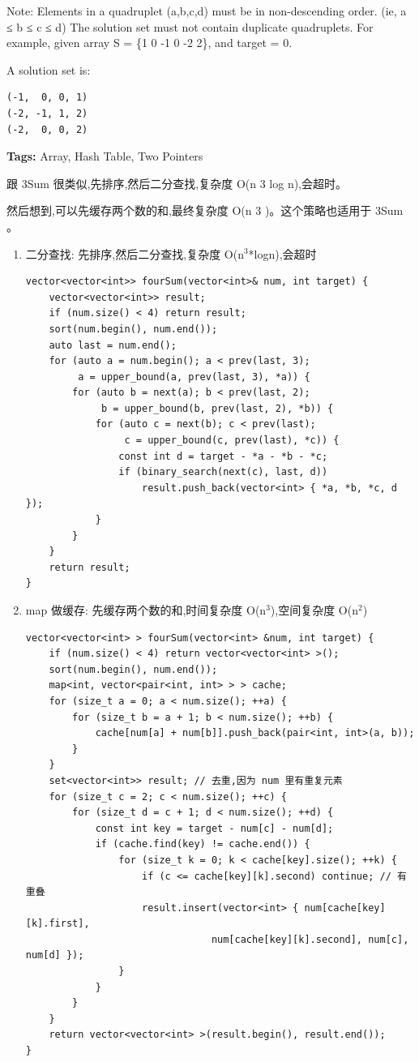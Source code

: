 \documentclass[12pt]{book}
\begin{document}
Note:
Elements in a quadruplet (a,b,c,d) must be in non-descending order. (ie, a ≤ b ≤ c ≤ d)
The solution set must not contain duplicate quadruplets.
    For example, given array S = \{1 0 -1 0 -2 2\}, and target = 0.

A solution set is:
\lstset{language=java,label= ,caption= ,numbers=none}
\begin{lstlisting}
(-1,  0, 0, 1)
(-2, -1, 1, 2)
(-2,  0, 0, 2)
\end{lstlisting}

\textbf{Tags:} Array, Hash Table, Two Pointers

跟 3Sum 很类似,先排序,然后二分查找,复杂度 O(n 3 log n),会超时。

然后想到,可以先缓存两个数的和,最终复杂度 O(n 3 )。这个策略也适用于 3Sum 。

\begin{enumerate}
\item 二分查找: 先排序,然后二分查找,复杂度 O(n$^{\text{3}}$*logn),会超时
\label{sec-15-2-3-1}
\lstset{language=java,label= ,caption= ,numbers=none}
\begin{lstlisting}
vector<vector<int>> fourSum(vector<int>& num, int target) {
    vector<vector<int>> result;
    if (num.size() < 4) return result;
    sort(num.begin(), num.end());
    auto last = num.end();
    for (auto a = num.begin(); a < prev(last, 3);
         a = upper_bound(a, prev(last, 3), *a)) {
        for (auto b = next(a); b < prev(last, 2);
             b = upper_bound(b, prev(last, 2), *b)) {
            for (auto c = next(b); c < prev(last);
                 c = upper_bound(c, prev(last), *c)) {
                const int d = target - *a - *b - *c;
                if (binary_search(next(c), last, d))
                    result.push_back(vector<int> { *a, *b, *c, d });
            }
        }
    }
    return result;
}
\end{lstlisting}
\item map 做缓存: 先缓存两个数的和,时间复杂度 O(n$^{\text{3}}$),空间复杂度 O(n$^{\text{2}}$)
\label{sec-15-2-3-2}
\lstset{language=java,label= ,caption= ,numbers=none}
\begin{lstlisting}
vector<vector<int> > fourSum(vector<int> &num, int target) {
    if (num.size() < 4) return vector<vector<int> >();
    sort(num.begin(), num.end());
    map<int, vector<pair<int, int> > > cache;
    for (size_t a = 0; a < num.size(); ++a) {
        for (size_t b = a + 1; b < num.size(); ++b) {
            cache[num[a] + num[b]].push_back(pair<int, int>(a, b));
        }
    }
    set<vector<int>> result; // 去重,因为 num 里有重复元素
    for (size_t c = 2; c < num.size(); ++c) {
        for (size_t d = c + 1; d < num.size(); ++d) {
            const int key = target - num[c] - num[d];
            if (cache.find(key) != cache.end()) {
                for (size_t k = 0; k < cache[key].size(); ++k) {
                    if (c <= cache[key][k].second) continue; // 有重叠
                    result.insert(vector<int> { num[cache[key][k].first],
                                num[cache[key][k].second], num[c], num[d] });
                }
            }
        }
    }
    return vector<vector<int> >(result.begin(), result.end());
}
\end{lstlisting}
\end{enumerate}
\end{document}
